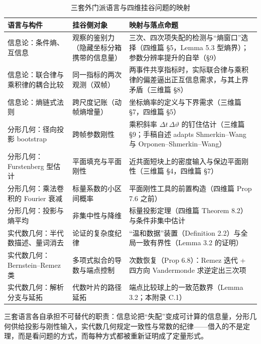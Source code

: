 \begin{table}[t]
\centering
\caption{三套外门派语言与四维挂谷问题的映射}
\label{tab:langmap}
\footnotesize
\begin{tabularx}{\textwidth}{@{}L{2.5cm}L{4.4cm}Y@{}}
\toprule
{}\textbf{语言与构件} & \textbf{挂谷侧对象} & \textbf{映射与落点命题} \\
\midrule
信息论：条件熵、互信息 & 观察的鉴别力（隐藏坐标分箱携带的信息量） & 三次、四次项失配的检测与“熵窗口”选择（四维篇 §5，Lemma 5.3 型熵界）；参数分辨率提升的自举（§9） \\
信息论：联合律与乘积律的耦合比较 & 同一指标的两次观测（双帧） & 两事件共享指标时，实际联合律与乘积律的偏差逼出正互信息需求，与其上界矛盾（三维篇 §8） \\
信息论：熵链式法则 & 跨尺度记账（动帧熵增量） & 坐标熵率的定义与下界需求（三维篇 §7，四维篇 §5） \\
分形几何：径向投影 bootstrap & 跨帧参数刚性 & 乘积斜率 $\Delta t\,\Delta\vartheta$ 的钉住估计（三维篇 §9；手稿自述 adapts Shmerkin--Wang 与 Orponen--Shmerkin--Wang） \\
分形几何：Furstenberg 型估计 & 平面填充与平面刚性 & 近共面短块上的密度输入与保边平面刚性（三维篇 §4，四维篇 §7） \\
分形几何：乘法卷积的 Fourier 衰减 & 标量系数的小区间概率 & 平面刚性工具的前置构造（四维篇 Prop 7.6 之前） \\
分形几何：投影与熵平均 & 非集中性与降维 & 标量投影定理（四维篇 Theorem 8.2）与条件非集中估计 \\
实代数几何：半代数描述、量词消去 & 论证的复杂度纪律 & “温和数据”装置（Definition 2.2）与全局一致有界性（Lemma 3.2 的证明） \\
实代数几何：Bernstein--Remez 类 & 多项式拟合的导数与端点控制 & 次数恢复（Prop 6.8）：Remez 迭代 + 四方向 Vandermonde 求逆定出三次项 \\
实代数几何：解析分支与延拓 & 代数叶片的路径延拓 & 端点比较球上的一致范数界（Lemma 3.2；本附录 C.1） \\
\bottomrule
\end{tabularx}
\end{table}

\begin{keybox}[可记忆主句]
三套语言各自承担不可替代的职责：信息论把“失配”变成可计算的信息量，分形几何供给投影与刚性输入，实代数几何规定一致性与常数的纪律——借入的不是定理，而是看问题的方式，而每种方式都被重新证明成了定量形式。
\end{keybox}